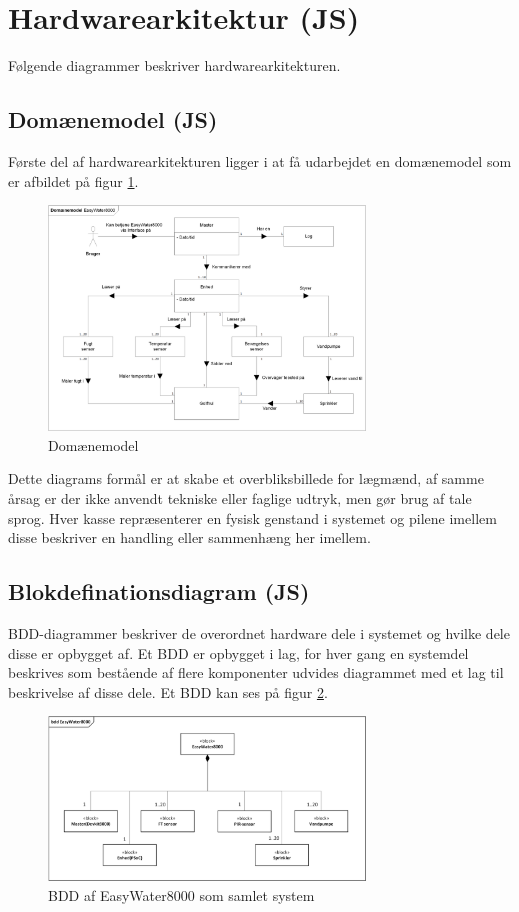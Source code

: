 \section{Hardwarearkitektur (JS)}
Følgende diagrammer beskriver hardwarearkitekturen. 

\subsection{Domænemodel (JS)}
Første del af hardwarearkitekturen ligger i at få udarbejdet en domænemodel som er afbildet på figur \ref{lab:Domainmodel}.

\begin{figure}[H]
  \centering
    \includegraphics[width=0.75\textwidth]{Billeder/Domainmodel}
    \caption{Domænemodel}
    \label{lab:Domainmodel}
\end{figure}

Dette diagrams formål er at skabe et overbliksbillede for lægmænd, af samme årsag er der ikke anvendt tekniske eller faglige udtryk, men gør brug af tale sprog. Hver kasse repræsenterer en fysisk genstand i systemet og pilene imellem disse beskriver en handling eller sammenhæng her imellem.

\subsection{Blokdefinationsdiagram (JS)}
BDD-diagrammer beskriver de overordnet hardware dele i systemet og hvilke dele disse er opbygget af. Et BDD er opbygget i lag, for hver gang en systemdel beskrives som bestående af flere komponenter udvides diagrammet med et lag til beskrivelse af disse dele. Et BDD kan ses på figur \ref{lab:BDD}. 

\begin{figure}[H]
  \centering
    \includegraphics[width=0.75\textwidth]{Billeder/BDD}
    \caption{BDD af EasyWater8000 som samlet system}
    \label{lab:BDD}
\end{figure}

